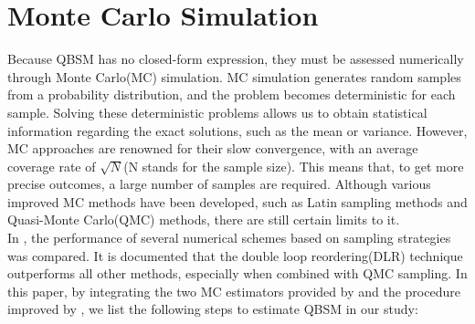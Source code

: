 \section{Monte Carlo Simulation} \label{sec:4}
\thispagestyle{plain} %

Because QBSM has no closed-form expression, they must be assessed numerically through Monte Carlo(MC) simulation\citep{fishman1996MonteCarloConcepts}. MC simulation generates random samples from a probability distribution, and the problem becomes deterministic for each sample. Solving these deterministic problems allows us to obtain statistical information regarding the exact solutions, such as the mean or variance. However, MC approaches are renowned for their slow convergence, with an average coverage rate of $\sqrt N$(N stands for the sample size). This means that, to get more precise outcomes, a large number of samples are required.
Although various improved MC methods have been developed, such as Latin sampling methods\citep{loh1996LatinHypercubeSampling} and Quasi-Monte Carlo(QMC) methods\citep{niederreiter1992RandomNumberGeneration}, there are still certain limits to it. \\

\noindent
In \cite{kucherenko2017DifferentNumericalEstimators}, the performance of several numerical schemes based on sampling strategies was compared. It is documented that the double loop reordering(DLR) technique outperforms all other methods, especially when combined with QMC sampling. In this paper, by integrating the two MC estimators provided by \cite{kucherenko2019QuantileBasedGlobal} and the procedure improved by \cite{song2021QuantileSensitivityMeasures}, we list the following steps to estimate QBSM in our study:

